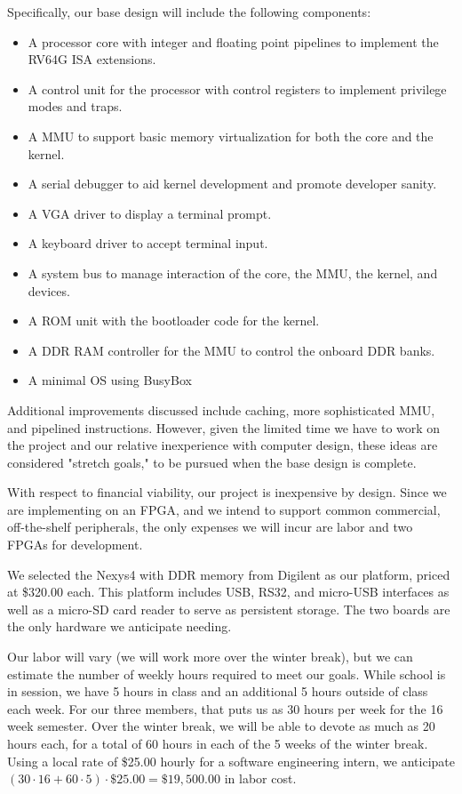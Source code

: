 \documentclass{article}
\begin{document}
Specifically, our base design will include the following components:
\begin{itemize}
    \item A processor core with integer and floating point pipelines to implement the RV64G ISA extensions.
    \item A control unit for the processor with control registers to implement privilege modes and traps.
    \item A MMU to support basic memory virtualization for both the core and the kernel.
    \item A serial debugger to aid kernel development and promote developer sanity.
    \item A VGA driver to display a terminal prompt.
    \item A keyboard driver to accept terminal input.
    \item A system bus to manage interaction of the core, the MMU, the kernel, and devices.
    \item A ROM unit with the bootloader code for the kernel.
    \item A DDR RAM controller for the MMU to control the onboard DDR banks.
    \item A minimal OS using BusyBox
\end{itemize}

Additional improvements discussed include caching, more sophisticated MMU, and pipelined instructions.  However, given the limited time we have to work on the project and our relative inexperience with computer design, these ideas are considered "stretch goals," to be pursued when the base design is complete.

With respect to financial viability, our project is inexpensive by design.  Since we are implementing on an FPGA, and we intend to support common commercial, off-the-shelf peripherals, the only expenses we will incur are labor and two FPGAs for development.  

We selected the Nexys4 with DDR memory from Digilent as our platform, priced at \$320.00 each.  This platform includes USB, RS32, and micro-USB interfaces as well as a micro-SD card reader to serve as persistent storage.  The two boards are the only hardware we anticipate needing.

Our labor will vary (we will work more over the winter break), but we can estimate the number of weekly hours required to meet our goals.  While school is in session, we have 5 hours in class and an additional 5 hours outside of class each week.  For our three members, that puts us as 30 hours per week for the 16 week semester.  Over the winter break, we will be able to devote as much as 20 hours each, for a total of 60 hours in each of the 5 weeks of the winter break.  Using a local rate of \$25.00 hourly for a software engineering intern, we anticipate $(30\cdot 16 + 60\cdot 5)\cdot \$25.00 = \$19,500.00$ in labor cost.
\end{document}
